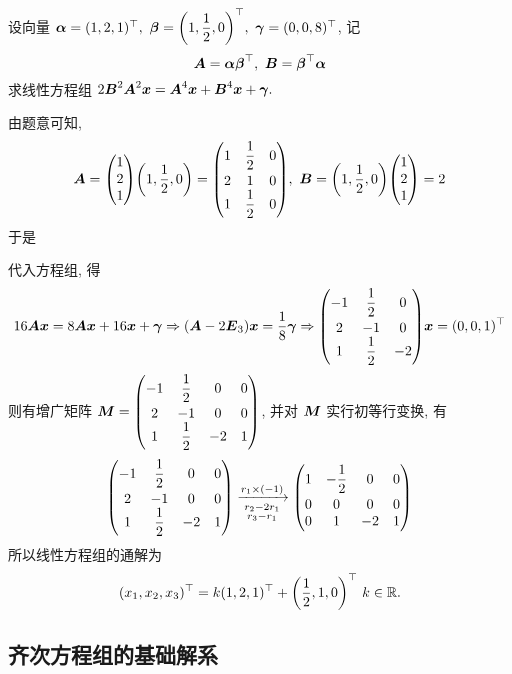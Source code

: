 \begin{example}
    设向量 $\vb*{\alpha}=(1,2,1)^\top,~\vb*{\beta}=\qty(1,\dfrac{1}{2},0)^\top,~\vb*{\gamma}=(0,0,8)^\top$, 记
    $$\vb*{A}=\vb*{\alpha\beta}^\top,~\vb*{B}=\vb*{\beta}^\top\vb*{\alpha}$$
    求线性方程组 $2\vb*{B}^2\vb*{A}^2\vb*{x}=\vb*{A}^4\vb*{x}+\vb*{B}^4\vb*{x}+\vb*{\gamma}.$
\end{example}
\begin{solution}
    由题意可知, $$\vb*{A}=\mqty(1\\2\\1)\qty(1,\dfrac{1}{2},0)=\mqty(1&\dfrac{1}{2}&0\\[6pt]2&1&0\\1&\dfrac{1}{2}&0),~\vb*{B}=\qty(1,\dfrac{1}{2},0)\mqty(1\\2\\1)=2$$
    于是
    代入方程组, 得 $$16\vb*{Ax}=8\vb*{Ax}+16\vb*{x}+\vb*{\gamma}\Rightarrow (\vb*{A}-2\vb*{E}_3)\vb*{x}=\dfrac{1}{8}\vb*{\gamma}\Rightarrow \mqty(-1&\dfrac{1}{2}&0\\[6pt]2&-1&0\\1&\dfrac{1}{2}&-2)\vb*{x}=(0,0,1)^\top$$
    则有增广矩阵 $\vb*{M}=\mqty(-1&\dfrac{1}{2}&0&0\\[6pt]2&-1&0&0\\1&\dfrac{1}{2}&-2&1)$, 并对 $\vb*{M}$ 实行初等行变换, 有
    $$\mqty(-1&\dfrac{1}{2}&0&0\\[6pt]2&-1&0&0\\1&\dfrac{1}{2}&-2&1)\xrightarrow[\substack{r_2-2r_1\\r_3-r_1}]{r_1\times(-1)}\mqty(1&-\dfrac{1}{2}&0&0\\[6pt]0&0&0&0\\0&1&-2&1)$$
    所以线性方程组的通解为 $$(x_1,x_2,x_3)^\top=k(1,2,1)^\top+\qty(\dfrac{1}{2},1,0)^\top~  k\in\mathbb{R} .$$
\end{solution}

\subsection{齐次方程组的基础解系}


